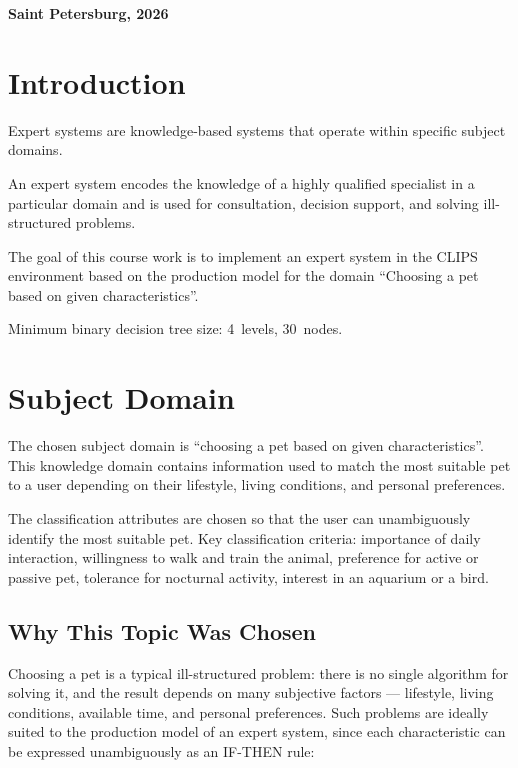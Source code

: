\documentclass[a4paper,final]{article}
\begin{document}
	\hfill \break
	\hfill \break
	\begin{center} \small\bf{Saint Petersburg, 2026} \end{center}
	\thispagestyle{empty}

\newpage
\tableofcontents


\newpage
\section*{Introduction}

Expert systems are knowledge-based systems that operate within specific subject domains.

An expert system encodes the knowledge of a highly qualified specialist in a particular domain and is used for consultation, decision support, and solving ill-structured problems.

The goal of this course work is to implement an expert system in the CLIPS environment based on the production model for the domain ``Choosing a pet based on given characteristics''.

Minimum binary decision tree size: 4~levels, 30~nodes.


\newpage
\section{Subject Domain}

The chosen subject domain is ``choosing a pet based on given characteristics''. This knowledge domain contains information used to match the most suitable pet to a user depending on their lifestyle, living conditions, and personal preferences.

The classification attributes are chosen so that the user can unambiguously identify the most suitable pet. Key classification criteria: importance of daily interaction, willingness to walk and train the animal, preference for active or passive pet, tolerance for nocturnal activity, interest in an aquarium or a bird.

\subsection*{Why This Topic Was Chosen}

Choosing a pet is a typical ill-structured problem: there is no single algorithm for solving it, and the result depends on many subjective factors --- lifestyle, living conditions, available time, and personal preferences. Such problems are ideally suited to the production model of an expert system, since each characteristic can be expressed unambiguously as an IF-THEN rule:
\end{document}
